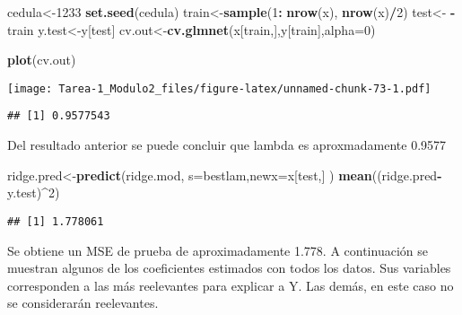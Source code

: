 \documentclass[
]{article}
\newenvironment{Shaded}{\begin{snugshade}}{\end{snugshade}}
\newcommand{\DataTypeTok}[1]{\textcolor[rgb]{0.13,0.29,0.53}{#1}}
\newcommand{\DecValTok}[1]{\textcolor[rgb]{0.00,0.00,0.81}{#1}}
\newcommand{\KeywordTok}[1]{\textcolor[rgb]{0.13,0.29,0.53}{\textbf{#1}}}
\newcommand{\NormalTok}[1]{#1}
\newcommand{\OperatorTok}[1]{\textcolor[rgb]{0.81,0.36,0.00}{\textbf{#1}}}
\newcommand{\StringTok}[1]{\textcolor[rgb]{0.31,0.60,0.02}{#1}}
\begin{document}
\begin{Shaded}
\begin{Highlighting}[]
\NormalTok{cedula<-}\DecValTok{1233}
\KeywordTok{set.seed}\NormalTok{(cedula)}
\NormalTok{train<-}\KeywordTok{sample}\NormalTok{(}\DecValTok{1}\OperatorTok{:}\StringTok{ }\KeywordTok{nrow}\NormalTok{(x), }\KeywordTok{nrow}\NormalTok{(x)}\OperatorTok{/}\DecValTok{2}\NormalTok{)}
\NormalTok{test<-}\StringTok{ }\OperatorTok{-}\NormalTok{train}
\NormalTok{y.test<-y[test] }
\NormalTok{cv.out<-}\KeywordTok{cv.glmnet}\NormalTok{(x[train,],y[train],}\DataTypeTok{alpha=}\DecValTok{0}\NormalTok{)}
\end{Highlighting}
\end{Shaded}

\begin{Shaded}
\begin{Highlighting}[]
\KeywordTok{plot}\NormalTok{(cv.out)}
\end{Highlighting}
\end{Shaded}

\texttt{[image: Tarea-1\_Modulo2\_files/figure-latex/unnamed-chunk-73-1.pdf]}

\begin{Shaded}
\end{Shaded}

\begin{verbatim}
## [1] 0.9577543
\end{verbatim}

Del resultado anterior se puede concluir que lambda es aproxmadamente
0.9577

\begin{Shaded}
\begin{Highlighting}[]
\NormalTok{ridge.pred<-}\KeywordTok{predict}\NormalTok{(ridge.mod, }\DataTypeTok{s=}\NormalTok{bestlam,}\DataTypeTok{newx=}\NormalTok{x[test,] )}
\KeywordTok{mean}\NormalTok{((ridge.pred}\OperatorTok{-}\NormalTok{y.test)}\OperatorTok{^}\DecValTok{2}\NormalTok{)}
\end{Highlighting}
\end{Shaded}

\begin{verbatim}
## [1] 1.778061
\end{verbatim}

Se obtiene un MSE de prueba de aproximadamente 1.778. A continuación se
muestran algunos de los coeficientes estimados con todos los datos. Sus
variables corresponden a las más reelevantes para explicar a Y. Las
demás, en este caso no se considerarán reelevantes.
\end{document}

